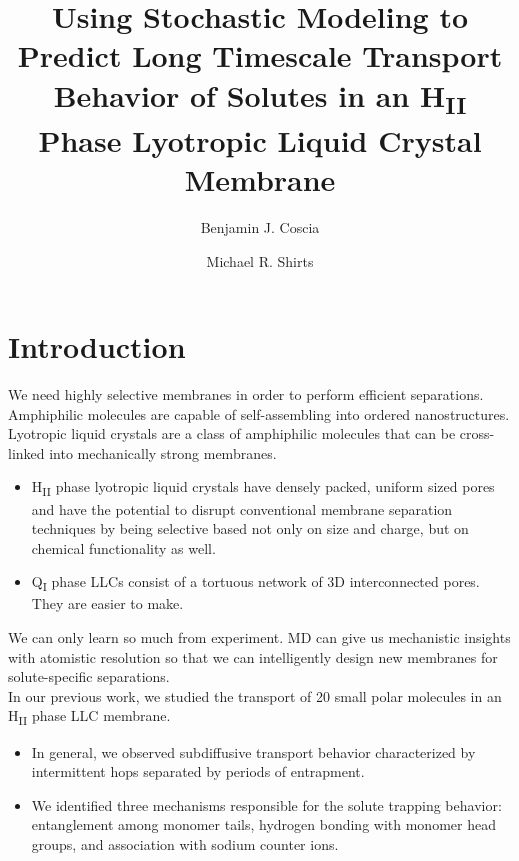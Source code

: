 \documentclass{article}
\title{Using Stochastic Modeling to Predict Long Timescale Transport Behavior of Solutes in an H\textsubscript{II} Phase Lyotropic Liquid Crystal Membrane}
\author{Benjamin J. Coscia \and Michael R. Shirts}
\begin{document}
  \graphicspath{{./figures/}}
  \maketitle

  \section{Introduction}
  We need highly selective membranes in order to perform efficient separations. \\

  \noindent Amphiphilic molecules are capable of self-assembling into ordered nanostructures.\\

  Lyotropic liquid crystals are a class of amphiphilic molecules that can be cross-linked
  into mechanically strong membranes.
  \begin{itemize}
  	\item H\textsubscript{II} phase lyotropic liquid crystals have densely packed, uniform
	sized pores and have the potential to disrupt conventional membrane separation
	techniques by being selective based not only on size and charge, but on chemical
	functionality as well.
	\item Q\textsubscript{I} phase LLCs consist of a tortuous network of 3D interconnected
	pores. They are easier to make.
  \end{itemize}

  We can only learn so much from experiment. MD can give us mechanistic insights with
  atomistic resolution so that we can intelligently design new membranes for 
  solute-specific separations.\\

  \noindent In our previous work, we studied the transport of 20 small polar molecules
  in an H\textsubscript{II} phase LLC membrane.
  \begin{itemize}
    \item In general, we observed subdiffusive transport behavior characterized 
    by intermittent hops separated by periods of entrapment.
    \item We identified three mechanisms responsible for the solute trapping behavior:
    entanglement among monomer tails, hydrogen bonding with monomer head groups, and
    association with sodium counter ions.
  \end{itemize}

\end{document}

